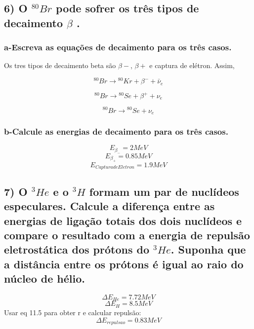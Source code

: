 \documentclass{article}
\begin{document}
\pagebreak

\subsection*{6) O ${}^{80}Br$ pode sofrer os três tipos de decaimento $\beta$ .}

\subsubsection*{a-Escreva as equações de decaimento para os três casos.}

Os tres tipos de decaimento beta são $\beta-$, $\beta+$ e captura de elétron. Assim,

\[{}^{80}Br \to {}^{80}Kr + \beta^- + \bar{\nu}_e\]

\[{}^{80}Br \to {}^{80}Se + \beta^+ + \nu_e\]

\[{}^{80}Br \to {}^{80}Se + \nu_e \]


\subsubsection*{b-Calcule as energias de decaimento para os três casos.}
\[E_{\beta_-} =  2 MeV\]
\[E_{\beta_+} =  0.85 MeV\]
\[E_{Captura de Eletron} =  1.9 MeV\]

\subsection*{7) O ${}^{3}He$ e o ${}^{3}H$ formam um par de nuclídeos especulares. Calcule a diferença entre as energias de ligação totais dos dois nuclídeos e compare o resultado com a energia de repulsão eletrostática dos prótons do ${}^{3}He$. Suponha que a distância entre os prótons é igual ao raio do núcleo de hélio.}
\[\Delta E_{He} =  7.72 MeV\]
\[\Delta E_{H} =  8.5 MeV\]
Usar eq 11.5 para obter r e calcular repulsão:
\[\Delta E_{repulsao} = 0.83 MeV\]
\end{document}
